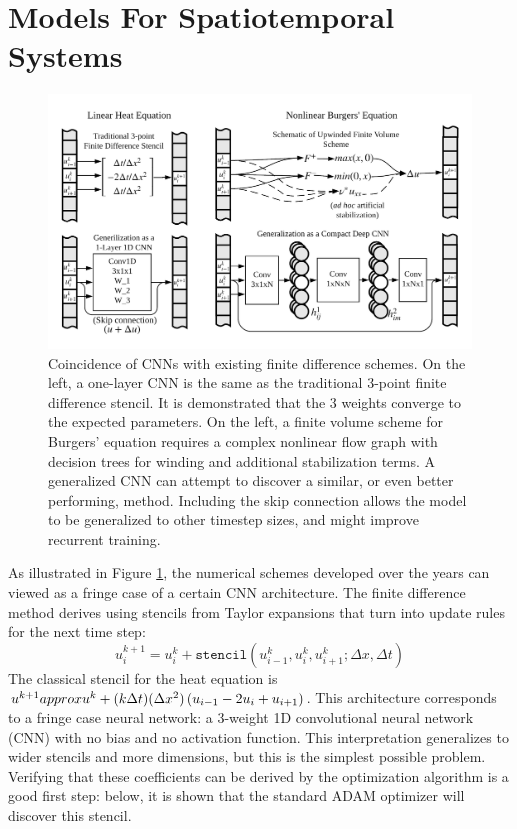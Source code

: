 \documentclass{article}
\begin{document}
\section{Models For Spatiotemporal Systems}

\begin{figure}
  \centering
  \includegraphics[width=5in]{CNN_FDM.png}  
  \caption{\label{fig:cnn_fdm}Coincidence of CNNs with existing finite difference
    schemes. On the left, a one-layer CNN is the same as the traditional 3-point finite difference
    stencil. It is demonstrated that the 3 weights converge to the
    expected parameters. On the left, a finite volume scheme for
    Burgers' equation requires a complex nonlinear flow graph with
    decision trees for winding and additional stabilization terms. A generalized CNN can attempt to
    discover a similar, or even better performing, method. Including the skip connection
    allows the model to be generalized to other timestep sizes, and
    might improve recurrent training.}
\end{figure}

As illustrated in Figure \ref{fig:cnn_fdm}, the numerical schemes
developed over the years can viewed as a fringe case of a certain CNN
architecture. The finite difference method derives using stencils from
Taylor expansions that turn into update rules for the next time step:
\begin{equation}
  u^{k+1}_{i} = u^k_{i}+\mathtt{stencil}\left( u^k_{i-1}, u^k_{i},u^{k}_{i+1}; \Delta x, \Delta t\right)
\end{equation}
The classical stencil for the heat equation is
$u^{k+1}\\approx u^k+(k\Delta t)(\Delta x^2) \left(u_{i-1} - 2 u_{i} +
  u_{i+1}\right)$.
This architecture corresponds to a fringe case neural network: a
3-weight 1D convolutional neural network (CNN) with no bias and no
activation function. This interpretation
generalizes to wider stencils and more dimensions, but this is the
simplest possible problem.
Verifying that these coefficients can be derived by the optimization
algorithm is a good first step: below, it is shown that the standard
ADAM optimizer will discover this stencil.
\end{document}

